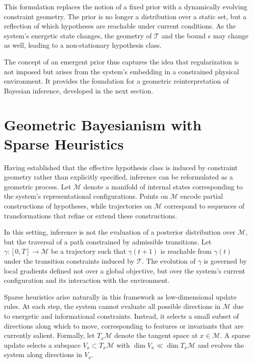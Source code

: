 \documentclass[12pt]{article}
\theoremstyle{plain}
\theoremstyle{definition}
\theoremstyle{remark}
\begin{document}
This formulation replaces the notion of a fixed prior with a dynamically evolving constraint geometry. The prior is no longer a distribution over a static set, but a reflection of which hypotheses are reachable under current conditions. As the system's energetic state changes, the geometry of $\mathcal{T}$ and the bound $\epsilon$ may change as well, leading to a non-stationary hypothesis class.

The concept of an emergent prior thus captures the idea that regularization is not imposed but arises from the system's embedding in a constrained physical environment. It provides the foundation for a geometric reinterpretation of Bayesian inference, developed in the next section.

\section{Geometric Bayesianism with Sparse Heuristics}

Having established that the effective hypothesis class is induced by constraint geometry rather than explicitly specified, inference can be reformulated as a geometric process. Let $\mathcal{M}$ denote a manifold of internal states corresponding to the system's representational configurations. Points on $\mathcal{M}$ encode partial constructions of hypotheses, while trajectories on $\mathcal{M}$ correspond to sequences of transformations that refine or extend these constructions.

In this setting, inference is not the evaluation of a posterior distribution over $\mathcal{M}$, but the traversal of a path constrained by admissible transitions. Let $\gamma : [0,T] \to \mathcal{M}$ be a trajectory such that $\gamma(t+1)$ is reachable from $\gamma(t)$ under the transition constraints induced by $\mathcal{T}$. The evolution of $\gamma$ is governed by local gradients defined not over a global objective, but over the system's current configuration and its interaction with the environment.

Sparse heuristics arise naturally in this framework as low-dimensional update rules. At each step, the system cannot evaluate all possible directions in $\mathcal{M}$ due to energetic and informational constraints. Instead, it selects a small subset of directions along which to move, corresponding to features or invariants that are currently salient. Formally, let $T_x\mathcal{M}$ denote the tangent space at $x \in \mathcal{M}$. A sparse update selects a subspace $V_x \subset T_x\mathcal{M}$ with $\dim V_x \ll \dim T_x\mathcal{M}$ and evolves the system along directions in $V_x$.
\end{document}
